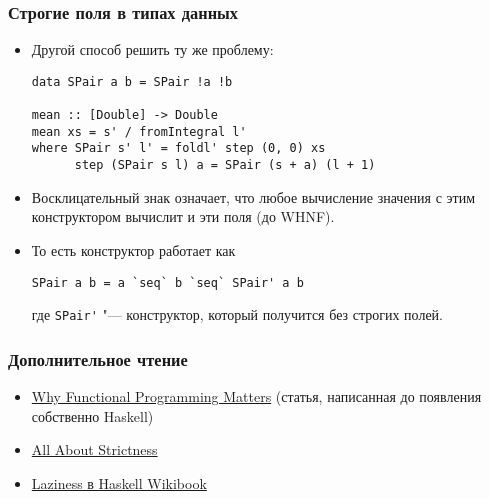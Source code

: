 \documentclass[11pt]{beamer}
\begin{document}
\begin{frame}[fragile]
\frametitle{Строгие поля в типах данных}
\begin{itemize}
    \item Другой способ решить ту же проблему:
\begin{lstlisting}[escapeinside=||,basicstyle=\ttfamily\footnotesize]
data SPair a b = SPair !a !b

mean :: [Double] -> Double
mean xs = s' / fromIntegral l'
where SPair s' l' = foldl' step (0, 0) xs
      step (SPair s l) a = SPair (s + a) (l + 1)
\end{lstlisting}
    \pause
    \item Восклицательный знак означает, что любое вычисление значения с этим конструктором вычислит и эти поля (до WHNF).
    \item То есть конструктор работает как
\begin{lstlisting}[escapeinside=||,basicstyle=\ttfamily\footnotesize]
SPair a b = a `seq` b `seq` SPair' a b
\end{lstlisting}
где \lstinline|SPair'| "--- конструктор, который получится без строгих полей.
\end{itemize}
\end{frame}

\begin{frame}[fragile]
\frametitle{Дополнительное чтение}
\begin{itemize}
    \item \href{https://blog.acolyer.org/2016/09/14/why-functional-programming-matters/}{Why Functional Programming Matters} (статья, написанная до появления собственно Haskell)
    \item \href{https://www.fpcomplete.com/blog/2017/09/all-about-strictness}{All About Strictness}
    \item    \href{https://en.wikibooks.org/wiki/Haskell/Laziness}{Laziness в Haskell Wikibook}
\end{itemize}
\end{frame}
\end{document}
